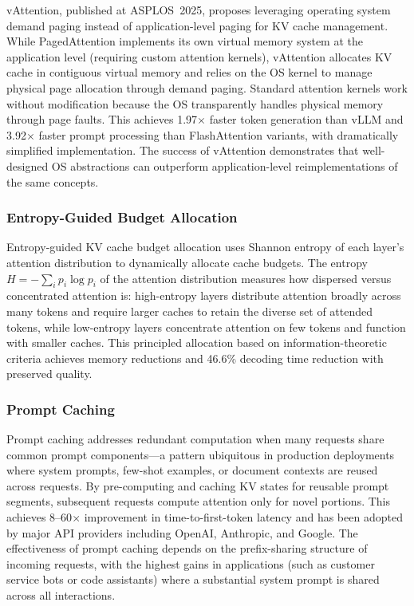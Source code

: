 \documentclass[11pt,letterpaper]{article}
\begin{document}
vAttention, published at ASPLOS~2025, proposes leveraging operating system demand paging instead of application-level paging for KV cache management. While PagedAttention implements its own virtual memory system at the application level (requiring custom attention kernels), vAttention allocates KV cache in contiguous virtual memory and relies on the OS kernel to manage physical page allocation through demand paging. Standard attention kernels work without modification because the OS transparently handles physical memory through page faults. This achieves 1.97$\times$ faster token generation than vLLM and 3.92$\times$ faster prompt processing than FlashAttention variants, with dramatically simplified implementation. The success of vAttention demonstrates that well-designed OS abstractions can outperform application-level reimplementations of the same concepts.

\subsubsection{Entropy-Guided Budget Allocation}

Entropy-guided KV cache budget allocation uses Shannon entropy of each layer's attention distribution to dynamically allocate cache budgets. The entropy $H = -\sum_i p_i \log p_i$ of the attention distribution measures how dispersed versus concentrated attention is: high-entropy layers distribute attention broadly across many tokens and require larger caches to retain the diverse set of attended tokens, while low-entropy layers concentrate attention on few tokens and function with smaller caches. This principled allocation based on information-theoretic criteria achieves memory reductions and 46.6\% decoding time reduction with preserved quality.

\subsubsection{Prompt Caching}

Prompt caching addresses redundant computation when many requests share common prompt components---a pattern ubiquitous in production deployments where system prompts, few-shot examples, or document contexts are reused across requests. By pre-computing and caching KV states for reusable prompt segments, subsequent requests compute attention only for novel portions. This achieves 8--60$\times$ improvement in time-to-first-token latency and has been adopted by major API providers including OpenAI, Anthropic, and Google. The effectiveness of prompt caching depends on the prefix-sharing structure of incoming requests, with the highest gains in applications (such as customer service bots or code assistants) where a substantial system prompt is shared across all interactions.
\end{document}
